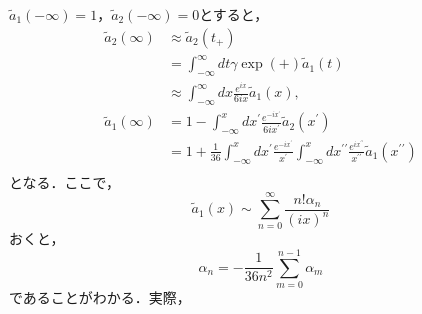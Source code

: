 \documentclass[a4paper, titlepage]{jsreport}
\begin{document}
$\tilde{a}_1(-\infty) =1$，$\tilde{a}_2(-\infty) = 0$とすると，
\begin{align}
  \tilde{a}_2(\infty)
  &\approx \tilde{a}_2(t_+)\\
  &= \int_{-\infty}^{\infty} dt \gamma \exp(+) \tilde{a}_1(t)\\
  &\approx \int_{-\infty}^{\infty} dx \frac{e^{ix}}{6ix} \tilde{a}_1(x),\\
  \tilde{a}_1(\infty)
  &= 1- \int_{-\infty}^x dx^{\prime} \frac{e^{-ix^{\prime}}}{6ix^{\prime}}  \tilde{a}_2(x^{\prime})\\
  &= 1 + \frac{1}{36} \int_{-\infty}^x dx^{\prime} \frac{e^{-ix^{\prime}}}{x^{\prime}} \int_{-\infty}^x dx^{\prime\prime} \frac{e^{ix^{\prime\prime}}}{x^{\prime\prime}} \tilde{a}_1(x^{\prime\prime})\\
\end{align}
となる．ここで，
\begin{equation}
  \tilde{a}_1(x) \sim \sum_{n=0}^{\infty} \frac{n! \alpha_n}{(ix)^n}
\end{equation}
おくと，
\begin{equation}
  \alpha_n = - \frac{1}{36 n^2} \sum_{m=0}^{n-1} \alpha_m 
\end{equation}
であることがわかる．実際，
\end{document}
